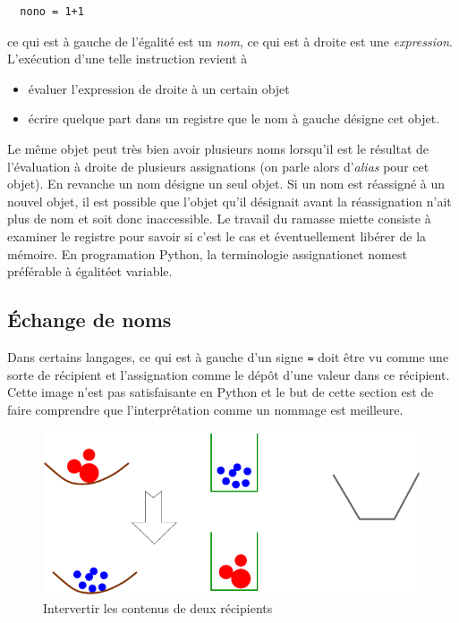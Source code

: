 \begin{verbatim}
  nono = 1+1
\end{verbatim}
ce qui est à gauche de l'égalité est un \emph{nom}, ce qui est à droite est une \emph{expression}. L'exécution d'une telle instruction revient à
\begin{itemize}
  \item évaluer l'expression de droite à un certain objet
  \item écrire quelque part dans un registre que le nom à gauche désigne cet objet.
\end{itemize}
Le même objet peut très bien avoir plusieurs noms lorsqu'il est le résultat de l'évaluation à droite de plusieurs assignations (on parle alors d'\emph{alias} pour cet objet). En revanche un nom désigne un seul objet. Si un nom est réassigné à un nouvel objet, il est possible que l'objet qu'il désignait avant la réassignation n'ait plus de nom et soit donc inaccessible. Le travail du ramasse miette consiste à examiner le registre pour savoir si c'est le cas et éventuellement libérer de la mémoire.\newline 
En programation Python, la terminologie \og assignation\fg et \og nom\fg est préférable à \og égalité\fg et \og variable\fg.

\subsection{\'Echange de noms}
Dans certains langages, ce qui est à gauche d'un signe \texttt{=} doit être vu comme une sorte de récipient et l'assignation comme le dépôt d'une valeur dans ce récipient. Cette image n'est pas satisfaisante en Python et le but de cette section est de faire comprendre que l'interprétation comme un nommage est meilleure.

\begin{figure}[!ht]
 \centering
 \includegraphics{Einterv_1.pdf}
 \caption{Intervertir les contenus de deux récipients}
 \label{fig:Einterv_1}
\end{figure}

